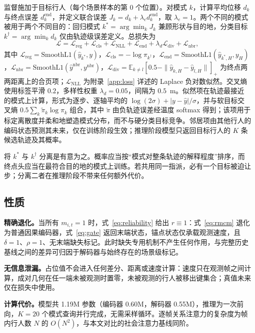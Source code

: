 监督施加于目标行人（每个场景样本的第 0 个位置）。对模式 $k$，计算平均位移 $d_{k}$ 与终点误差 $d^{\mathrm{end}}_{k}$，并定义联合误差 $J_{k}=d_{k}+\lambda_{e}d^{\mathrm{end}}_{k}$，取 $\lambda_{e}=1$。两个不同的模式被用于两个不同目的：回归模式 $k^{\ast}=\arg\min_{k}J_{k}$ 兼顾形状与目的地，分类目标 $k^{\dagger}=\arg\min_{k}d_{k}$ 仅由轨迹级误差定义。总损失为
\begin{equation}
\mathcal{L}=\mathcal{L}_{\mathrm{reg}}+\mathcal{L}_{\mathrm{cls}}
+\mathcal{L}_{\mathrm{NLL}}+\mathcal{L}_{\mathrm{end}}
+\lambda_{d}\mathcal{L}_{\mathrm{div}}+\mathcal{L}_{\mathrm{nbr}},
\label{eq:loss}
\end{equation}
其中 $\mathcal{L}_{\mathrm{reg}}=\mathrm{SmoothL1}(\hat{y}_{k^{\ast}},y)$，$\mathcal{L}_{\mathrm{cls}}=-\log\pi_{k^{\dagger}}$，$\mathcal{L}_{\mathrm{end}}=\mathrm{SmoothL1}(\hat{y}_{k^{\ast},H},y_{H})$，$\mathcal{L}_{\mathrm{nbr}}=\mathrm{SmoothL1}(\hat{y}^{\mathrm{nbr}},y^{\mathrm{nbr}})$，$\mathcal{L}_{\mathrm{div}}=\mathbb{E}_{k\ne l}[0.5-\|\hat{y}_{k,H}-\hat{y}_{l,H}\|]_{+}$ 为终点两两距离上的合页项；$\mathcal{L}_{\mathrm{NLL}}$ 为附录~\ref{app:loss} 详述的 Laplace 负对数似然。交叉熵使用标签平滑 $0.2$，多样性权重 $\lambda_{d}=0.05$，间隔为 $0.5$~m。似然项在轨迹最接近的模式上计算，形式为逐步、逐轴平均的 $\log(2\sigma)+|y-\hat{y}|/\sigma$，并与软目标交叉熵 $0.5\sum_{k}\tilde{\pi}_{k}\log\pi_{k}$ 组合，其中 $\tilde{\pi}$ 由负轨迹误差经温度 softmax 得到；该项用于标定离散度并柔和地塑造模式分布，而不与硬分类目标竞争。邻居项由其他行人的编码状态预测其未来，仅在训练阶段生效；推理阶段模型只返回目标行人的 $K$ 条候选轨迹及其概率。

将 $k^{\ast}$ 与 $k^{\dagger}$ 分离是有意为之。概率应当按“模式对整条轨迹的解释程度”排序，而终点头应当在最符合目的地的模式上训练。若共用同一指派，必有一个目标被迫让步；分离二者在推理阶段不带来任何额外代价。

\subsection{性质}

\textbf{精确退化。}当所有 $m_{i,t}=1$ 时，式~\eqref{eq:reliability} 给出 $r\equiv1$：式~\eqref{eq:rmcm} 退化为普通因果编码器，式~\eqref{eq:gate} 返回末端状态，锚点状态仅承载观测速度，且 $\delta=1$、$\rho=1$、无末端缺失标记。此时缺失专用机制不产生任何作用，与完整历史基线之间的差异可归因于解码器与始终存在的场景级标记。

\textbf{无信息泄漏。}占位值不会进入任何差分、距离或速度计算：速度只在观测帧之间计算，成对几何在任一端未被观测时置零，未被观测的行人被移出键集合；真值未来仅在损失中使用。

\textbf{计算代价。}模型共 1.19M 参数（编码器 0.60M，解码器 0.55M），推理为一次前向，$K=20$ 个模式查询并行完成，无需采样循环。逐帧关系注意力的复杂度为帧内行人数 $N$ 的 $O(N^{2})$，与本文对比的社会注意力基线同阶。
